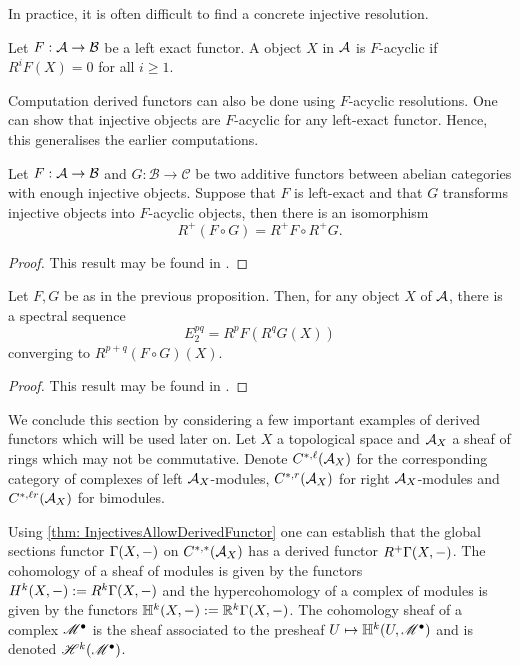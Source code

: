 In practice, it is often difficult to find a concrete injective resolution.
\begin{definition}
 Let $F:\AA \to \mathcal{B}$ be a left exact functor.
 A object $X$ in $\AA$ is $F$-acyclic if $R^iF(X) = 0$ for all $i\geq 1$.
\end{definition}
Computation derived functors can also be done using $F$-acyclic resolutions.
One can show that injective objects are $F$-acyclic for any left-exact functor.
Hence, this generalises the earlier computations.
\begin{proposition}\label{prop: GrothendieckIsomorphism}
  Let $F:\AA \to \mathcal{B}$ and $G:\mathcal{B}\to \mathcal{C}$ be two additive functors between abelian categories with enough injective objects. Suppose that $F$ is left-exact and that $G$ transforms injective objects into $F$-acyclic objects, then there is an isomorphism
  $$R^+(F\circ G) = R^+F \circ R^+ G.$$
\end{proposition}
\begin{proof}
  This result may be found in \cite[Chapter 1]{dimca2004sheaves}.
\end{proof}
\begin{theorem}
  Let $F,G$ be as in the previous proposition. Then, for any object $X$ of $\AA$, there is a spectral sequence
  $$E_2^{pq} = R^pF(R^qG(X)) $$
  converging to $R^{p+q}(F\circ G)(X).$
\end{theorem}
\begin{proof}
  This result may be found in \cite[Chapter 1]{dimca2004sheaves}.
\end{proof}
We conclude this section by considering a few important examples of derived functors which will be used later on.
Let $X$ a topological space and $\AA_X$ a sheaf of rings which may not be commutative.
Denote $C^{*,\ell}(\AA_X)$ for the corresponding category of complexes of left $\AA_X$-modules, $C^{*,r}(\AA_X)$ for right $\AA_X$-modules and $C^{*,\ell r}(\AA_X)$ for bimodules.

Using \cref{thm: InjectivesAllowDerivedFunctor} one can establish that the global sections functor $\Gamma(X,\blank)$ on $C^{*,*}(\AA_X)$ has a derived functor $R^+\Gamma(X,\blank)$.
The cohomology of a sheaf of modules is given by the functors $H^k(X,\blank) := R^k \Gamma(X,\blank)$ and the hypercohomology of a complex of modules is given by the functors $\mathbb{H}^k(X,\blank):= \mathbb{R}^k\Gamma(X,\blank)$.
The cohomology sheaf of a complex $\M^\bullet$ is the sheaf associated to the presheaf $U\mapsto \mathbb{H}^k(U,\M^\bullet)$ and is denoted $\H^k(\M^\bullet)$.

